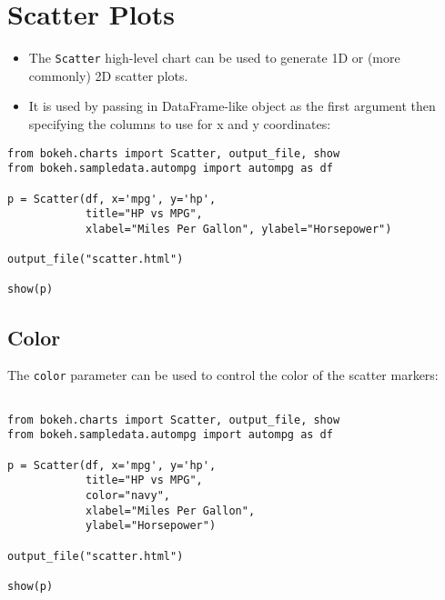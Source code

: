 \documentclass[a4paper,12pt]{article}
\begin{document}

\section{Scatter Plots}
\begin{itemize}
\item The \texttt{Scatter} high-level chart can be used to generate 1D or (more commonly) 2D scatter plots. 
\item It is used by passing in DataFrame-like object as the first argument then specifying the columns to use for x and y coordinates:
\end{itemize}


\begin{framed}
\begin{verbatim}
from bokeh.charts import Scatter, output_file, show
from bokeh.sampledata.autompg import autompg as df

p = Scatter(df, x='mpg', y='hp', 
            title="HP vs MPG",
            xlabel="Miles Per Gallon", ylabel="Horsepower")

output_file("scatter.html")

show(p)
\end{verbatim}
\end{framed}


\subsection{Color}
The \texttt{color} parameter can be used to control the color of the scatter markers:

\begin{framed}
\begin{verbatim}
	
from bokeh.charts import Scatter, output_file, show
from bokeh.sampledata.autompg import autompg as df

p = Scatter(df, x='mpg', y='hp', 
            title="HP vs MPG", 
            color="navy",   
            xlabel="Miles Per Gallon",
            ylabel="Horsepower")

output_file("scatter.html")

show(p)
\end{verbatim}
\end{framed}

\newpage
\end{document}
